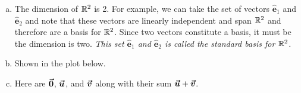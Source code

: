 \documentclass[12pt]{article} %
\newcommand{\ehat}{\boldsymbol{\hat{e}}}
\begin{document}
\begin{solution}
\begin{enumerate}[(a)]~
    \item The dimension of $\mathbb{R}^2$ is 2. For example, we can take the set of vectors $\ehat_1$ and $\ehat_2$ and note that these vectors are linearly independent and span $\mathbb{R}^2$ and therefore are a basis for $\mathbb{R}^2$. Since two vectors constitute a basis, it must be the dimension is two. \emph{This set $\ehat_1$ and $\ehat_2$ is called the standard basis for $\mathbb{R}^2$.}
    \item Shown in the plot below.
    \item Here are $\boldsymbol{\vec{0}}$, $\boldsymbol{\vec{u}}$, and $\boldsymbol{\vec{v}}$ along with their sum $\boldsymbol{\vec{u}}+\boldsymbol{\vec{v}}$.
    \begin{center}
\end{center}
\end{enumerate}
\end{solution}
\end{document}
